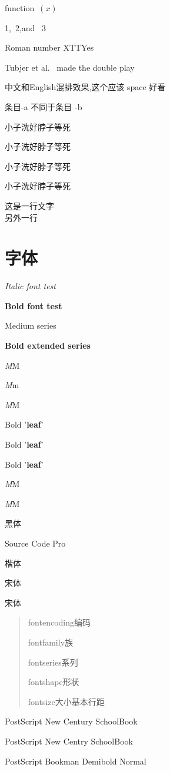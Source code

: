 \documentclass[UTF8]{ctexart}
\begin{document}
function~$(x)$ %

1,~2,and ~3 %

Roman number XTT\@ Yes

Tubjer et al. \ made the double play

中文和English混排效果,这个应该 space 好看

\mbox{条目}-a 不同于条目 -b

小子\phantom{4}洗好脖子等死

小子洗好脖子等死

小子\hphantom{4}洗好脖子等死 %

小子\vphantom{4}洗好脖子等死 %

这是一行文字 \\另外一行


\section{字体}


\textit{Italic font test}

{\bfseries Bold font test}

\textmd{Medium series}

\textbf{Bold extended series}

{\itshape M}M

\textit{M}m

{\itshape M\/}M

Bold '{\bfseries leaf}'

Bold '{\bfseries leaf\/}'

Bold '\textbf{leaf}'

\textit{M}M

\textit{M\nocorr}M


{黑体}

{Source Code Pro}

{楷体}

{宋体}

{\songti 宋体}   

\begin{quote}

fontencoding{编码}

fontfamily{族}

fontseries{系列}

fontshape{形状}

fontsize{大小}{基本行距}

\end{quote}

\fontsize{14}{17}\selectfont
PostScript New Century SchoolBook 

 PostScript New Centry SchoolBook

 PostScript Bookman Demibold Normal
\end{document}
